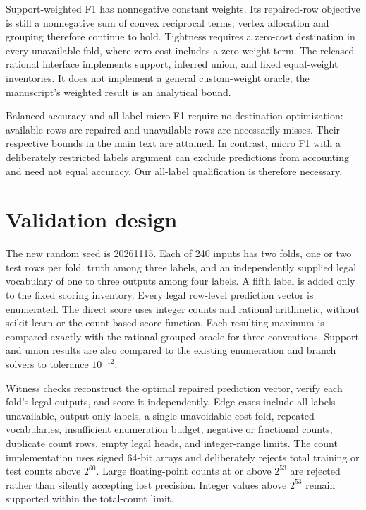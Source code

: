 \documentclass[onecolumn]{svjour3}
\begin{document}
Support-weighted F1 has nonnegative constant weights. Its repaired-row objective is still a nonnegative sum of convex reciprocal terms; vertex allocation and grouping therefore continue to hold. Tightness requires a zero-cost destination in every unavailable fold, where zero cost includes a zero-weight term. The released rational interface implements support, inferred union, and fixed equal-weight inventories. It does not implement a general custom-weight oracle; the manuscript's weighted result is an analytical bound.

Balanced accuracy and all-label micro F1 require no destination optimization: available rows are repaired and unavailable rows are necessarily misses. Their respective bounds in the main text are attained. In contrast, micro F1 with a deliberately restricted labels argument can exclude predictions from accounting and need not equal accuracy. Our all-label qualification is therefore necessary.

\section{Validation design}
The new random seed is 20261115. Each of 240 inputs has two folds, one or two test rows per fold, truth among three labels, and an independently supplied legal vocabulary of one to three outputs among four labels. A fifth label is added only to the fixed scoring inventory. Every legal row-level prediction vector is enumerated. The direct score uses integer counts and rational arithmetic, without scikit-learn or the count-based score function. Each resulting maximum is compared exactly with the rational grouped oracle for three conventions. Support and union results are also compared to the existing enumeration and branch solvers to tolerance $10^{-12}$.

Witness checks reconstruct the optimal repaired prediction vector, verify each fold's legal outputs, and score it independently. Edge cases include all labels unavailable, output-only labels, a single unavoidable-cost fold, repeated vocabularies, insufficient enumeration budget, negative or fractional counts, duplicate count rows, empty legal heads, and integer-range limits. The count implementation uses signed 64-bit arrays and deliberately rejects total training or test counts above $2^60$. Large floating-point counts at or above $2^53$ are rejected rather than silently accepting lost precision. Integer values above $2^53$ remain supported within the total-count limit.
\end{document}
